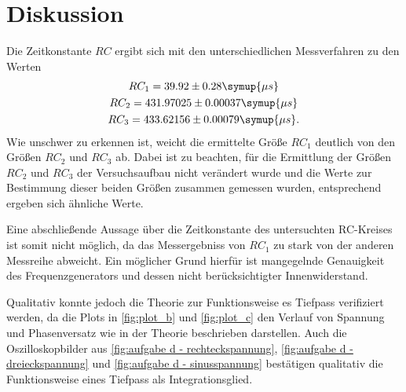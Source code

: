 \section{Diskussion}
\label{sec:Diskussion}
Die Zeitkonstante $RC$ ergibt sich mit den unterschiedlichen Messverfahren zu den Werten
\begin{gather}
    RC_{1} = 39.92\pm0.28\symup{\mu s} \notag \\
    RC_{2} = 431.97025\pm0.00037\symup{\mu s} \notag \\
    RC_{3} = 433.62156\pm0.00079\symup{\mu s} \notag .
\end{gather}
Wie unschwer zu erkennen ist, weicht die ermittelte Größe $RC_{1}$ deutlich von den Größen
$RC_{2}$ und $RC_{3}$ ab. Dabei ist zu beachten, für die Ermittlung der Größen $RC_{2}$ und $RC_{3}$
der Versuchsaufbau nicht verändert wurde und die Werte zur Bestimmung dieser beiden Größen zusammen gemessen wurden,
entsprechend ergeben sich ähnliche Werte.

Eine abschließende Aussage über die Zeitkonstante des untersuchten RC-Kreises ist somit nicht möglich,
da das Messergebniss von $RC_{1}$ zu stark von der anderen Messreihe abweicht. Ein möglicher Grund hierfür ist
mangegelnde Genauigkeit des Frequenzgenerators und dessen nicht berücksichtigter Innenwiderstand.

Qualitativ konnte jedoch die Theorie zur Funktionsweise es Tiefpass verifiziert werden, da die Plots
in \autoref{fig:plot_b} und \autoref{fig:plot_c} den Verlauf von Spannung und Phasenversatz wie in der Theorie 
beschrieben darstellen.
Auch die Oszilloskopbilder aus \autoref{fig:aufgabe d - rechteckspannung}, \autoref{fig:aufgabe d - dreieckspannung}
und \autoref{fig:aufgabe d - sinusspannung} bestätigen qualitativ die Funktionsweise eines Tiefpass als Integrationsglied.